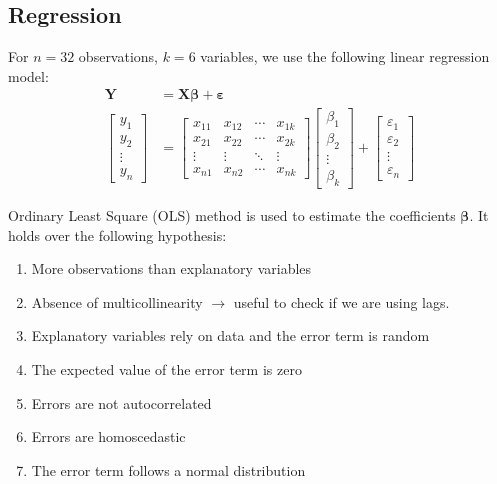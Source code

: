 \subsection{Regression}
For $n = 32$ observations, $k = 6$ variables, we use the following linear regression model:
\begin{align*}
    \boldsymbol{Y} & = \boldsymbol{X} \boldsymbol{\beta} + \boldsymbol{\varepsilon} \\
    \begin{bmatrix} 
        y_1 \\ y_2 \\ \vdots \\ y_n 
        \end{bmatrix} & = \begin{bmatrix}
        x_{11} & x_{12} & \cdots & x_{1k} \\ 
        x_{21} & x_{22} & \cdots & x_{2k} \\ 
        \vdots & \vdots & \ddots & \vdots \\ 
        x_{n1} & x_{n2} & \cdots & x_{nk} 
        \end{bmatrix} \begin{bmatrix}
        \beta_1 \\ \beta_2 \\ \vdots \\ \beta_k 
        \end{bmatrix} + \begin{bmatrix} 
        \varepsilon_1 \\ \varepsilon_2 \\ \vdots \\ \varepsilon_n \end{bmatrix}
\end{align*}

Ordinary Least Square (OLS) method is used to estimate the coefficients $\boldsymbol{\beta}$. It holds over the following hypothesis:
\begin{enumerate}
    \item More observations than explanatory variables
    \item Absence of multicollinearity $\to$ useful to check if we are using lags.
    \item Explanatory variables rely on data and the error term is random
    \item The expected value of the error term is zero
    \item Errors are not autocorrelated
    \item Errors are homoscedastic
    \item The error term follows a normal distribution
\end{enumerate}

